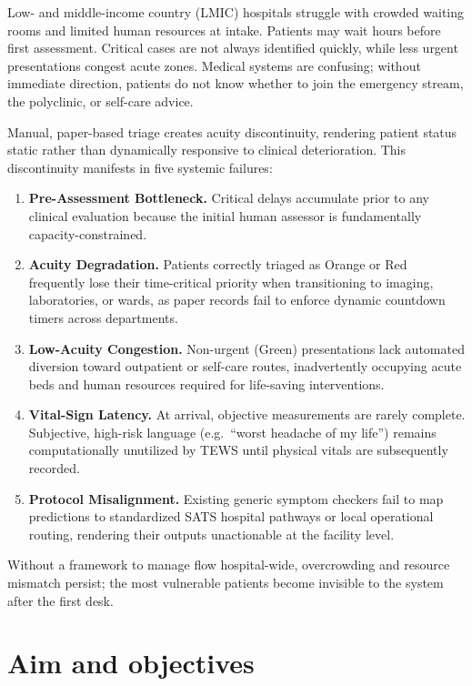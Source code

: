 Low- and middle-income country (LMIC) hospitals struggle with crowded waiting rooms and limited human resources at intake. Patients may wait hours before first assessment. Critical cases are not always identified quickly, while less urgent presentations congest acute zones. Medical systems are confusing; without immediate direction, patients do not know whether to join the emergency stream, the polyclinic, or self-care advice.

Manual, paper-based triage creates acuity discontinuity, rendering patient status static rather than dynamically responsive to clinical deterioration. This discontinuity manifests in five systemic failures:

\begin{enumerate}
\item \textbf{Pre-Assessment Bottleneck.} Critical delays accumulate prior to any clinical evaluation because the initial human assessor is fundamentally capacity-constrained.
\item \textbf{Acuity Degradation.} Patients correctly triaged as Orange or Red frequently lose their time-critical priority when transitioning to imaging, laboratories, or wards, as paper records fail to enforce dynamic countdown timers across departments.
\item \textbf{Low-Acuity Congestion.} Non-urgent (Green) presentations lack automated diversion toward outpatient or self-care routes, inadvertently occupying acute beds and human resources required for life-saving interventions.
\item \textbf{Vital-Sign Latency.} At arrival, objective measurements are rarely complete. Subjective, high-risk language (e.g.\ ``worst headache of my life'') remains computationally unutilized by TEWS until physical vitals are subsequently recorded.
\item \textbf{Protocol Misalignment.} Existing generic symptom checkers fail to map predictions to standardized SATS hospital pathways or local operational routing, rendering their outputs unactionable at the facility level.
\end{enumerate}

Without a framework to manage flow hospital-wide, overcrowding and resource mismatch persist; the most vulnerable patients become invisible to the system after the first desk.

\section{Aim and objectives}

